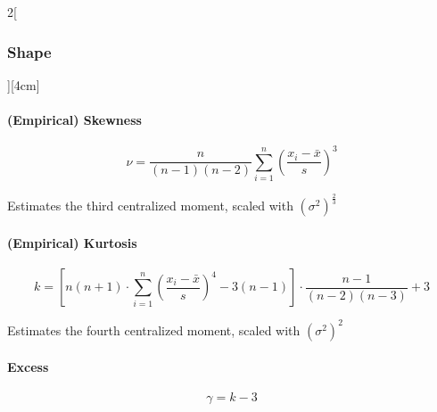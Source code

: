 \documentclass[8pt]{extarticle}
\begin{document}
\begin{multicols}{2}[\subsubsection{Shape}][4cm] 

\paragraph{(Empirical) Skewness}
$$\nu = \frac{n}{(n-1)(n-2)} \sum_{i=1}^n \left(\frac{x_i-\bar{x}}{s}\right)^3$$

\noindent Estimates the third centralized moment, scaled with $(\sigma^2)^{\frac{2}{3}}$

\paragraph{(Empirical) Kurtosis}

$$k=\left[n(n+1) \cdot \sum_{i=1}^n \left(\frac{x_i-\bar{x}}{s}\right)^4 - 3(n-1)\right] \cdot \frac{n-1}{(n-2)(n-3)}+3$$

\noindent Estimates the fourth centralized moment, scaled with $(\sigma^2)^2$

\paragraph{Excess}

$$\gamma=k-3$$

\end{multicols}
\end{document}
